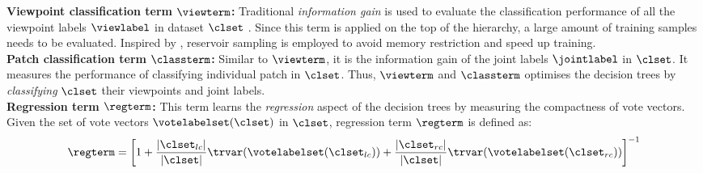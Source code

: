 \noindent\textbf{Viewpoint classification term $\viewterm$:} Traditional \emph{information gain} is used to evaluate the classification performance of all the viewpoint labels $\viewlabel$ in dataset $\clset$ \cite{Breiman2001}. Since this term is applied on the top of the hierarchy, a large amount of training samples needs to be evaluated. Inspired by \cite{Girshick2011}, reservoir sampling is employed to avoid memory restriction and speed up training.\\ 
\textbf{Patch classification term $\classterm$: } Similar to $\viewterm$, it is the information gain of the joint labels $\jointlabel$ in $\clset$. It measures the performance of classifying individual patch in $\clset$. 
Thus, $\viewterm$ and $\classterm$ optimises the decision trees by \emph{classifying} $\clset$ their viewpoints and joint labels. \\
\textbf{Regression term $\regterm$:} This term learns the \emph{regression} aspect of the decision trees by measuring the compactness of vote vectors. Given the set of vote vectors $\votelabelset(\clset)$ in $\clset$, regression term $\regterm$ is defined as:
\begin{equation}
	\regterm = \left[ 1 + 
	\frac{|\clset_{lc}|}{|\clset|} \trvar(\votelabelset(\clset_{lc})) +  
\frac{|\clset_{rc}|}{|\clset|} \trvar(\votelabelset(\clset_{rc})) \right]^{-1}
	\label{eq:regterm}
\end{equation}
